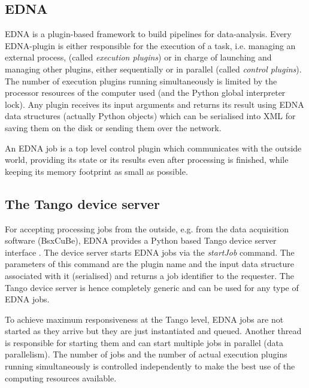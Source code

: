 \documentclass[preprint,pdf]{iucr}              %
\begin{document}


\subsection{EDNA}
EDNA \cite{EDNA} is a plugin-based framework to build pipelines for data-analysis.
Every EDNA-plugin is either responsible
for the execution of a task, i.e. managing an external process,
(called \textit{execution plugins}) or in charge of launching and managing other plugins, either sequentially or in
parallel (called \textit{control plugins}).
The number of execution plugins running simultaneously is limited by the
processor resources of the computer used (and the Python global interpreter
lock).
Any plugin receives its input arguments and returns its result using
EDNA data structures (actually Python objects) which can be serialised into XML
for saving them on the disk or sending them over the network.

An EDNA job is a top level control plugin which communicates with the outside
world, providing its state or its results even after processing is finished,
while keeping its memory footprint as small as possible.

\subsection{The Tango device server}
For accepting processing jobs from the outside, e.g. from the data
acquisition software (BsxCuBe), EDNA provides a Python based Tango device
server interface \cite{tango,pytango}.
The device server starts EDNA jobs via the \textit{startJob} command.
The parameters of this command are the plugin name and the input data structure
associated with it (serialised) and returns a job identifier to the requester.
The Tango device server is hence completely generic and can be used for any
type of EDNA jobs.

To achieve maximum responsiveness at the Tango level, EDNA jobs are not started as
they arrive but they are just instantiated and queued.
Another thread is responsible for starting them and can start multiple jobs in parallel
(data parallelism).
The number of jobs and the number of actual execution
plugins running simultaneously is controlled independently to make the best use
of the computing resources available.
\end{document}
